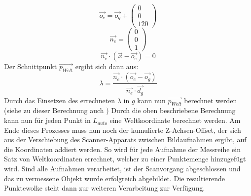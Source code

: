 \begin{equation}
\vec{o_{e}} = \vec{o_{g}} + \left(\begin{array}{c}0\\0\\120\end{array}\right)
\end{equation}
\begin{equation}
\vec{n_{e}} = \left(\begin{array}{c}0\\0\\1\end{array}\right)
\end{equation}
\begin{equation}
\vec{n_{e}} \cdot (\vec{x} - \vec{o_{e}}) = 0
\end{equation}
Der Schnittpunkt \(\vec{p_{Welt}}\) ergibt sich dann aus:
\begin{equation}
\lambda = \frac{\vec{n_{e}} \cdot ( \vec{o_{e}} - \vec{o_{g}} ) }{ \vec{n_{e}} \cdot \vec{d_{g} }}
\end{equation}
Durch das Einsetzen des errechneten \(\lambda\) in \(g\) kann nun \(\vec{p_{Welt}}\) berechnet werden (siehe zu dieser Berechnung auch \cite{Kowdle})\bigbreak
Durch die oben beschriebene Berechnung kann nun für jeden Punkt in \(L_{auto}\) eine Weltkoordinate berechnet werden. Am Ende dieses Prozesses muss nun noch der kumulierte Z-Achsen-Offset, der sich aus der Verschiebung des Scanner-Apparats zwischen Bildaufnahmen ergibt, auf die Koordinaten addiert werden. So wird für jede Aufnahme der Messreihe ein Satz von Weltkoordinaten errechnet, welcher zu einer Punktemenge hinzugefügt wird. Sind alle Aufnahmen verarbeitet, ist der Scanvorgang abgeschlossen und das zu vermessene Objekt wurde erfolgreich abgebildet. Die resultierende Punktewolke steht dann zur weiteren Verarbeitung zur Verfügung.

